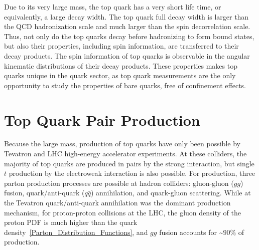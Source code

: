 Due to its very large mass, the top quark has a very short life time, or equivalently, a large decay width.
The top quark full decay width is larger than the QCD hadronization scale and much larger than the spin decorrelation scale.
Thus, not only do the top quarks decay before hadronizing to form bound states, but also their properties, including spin information, are transferred to their decay products.
The spin information of top quarks is observable in the angular kinematic distributions of their decay products.
These properties makes top quarks unique in the quark sector, as top quark measurements are the only opportunity to study the properties of bare quarks, free of confinement effects.

\section{Top Quark Pair Production}
\label{Top_Quark_Pair_Production}
Because the large mass, production of top quarks have only been possible by Tevatron and LHC high-energy accelerator experiments.
At these colliders, the majority of top quarks are produced in \ttbar pairs by the strong interaction, but single $t$ production by the electroweak interaction is also possible.
For \ttbar production, three parton production processes are possible at hadron colliders: gluon-gluon ($gg$) fusion, quark/anti-quark ($q\bar{q}$) annihilation, and quark-gluon scattering.
While at the Tevatron quark$\slash$anti-quark annihilation was the dominant production mechanism, for \beamenergy proton-proton collisions at the LHC, the gluon density of the proton PDF is much higher than the quark density~\ref{Parton_Distribution_Functions}, and $gg$ fusion accounts for \sim$90 \%$ of \ttbar production.

